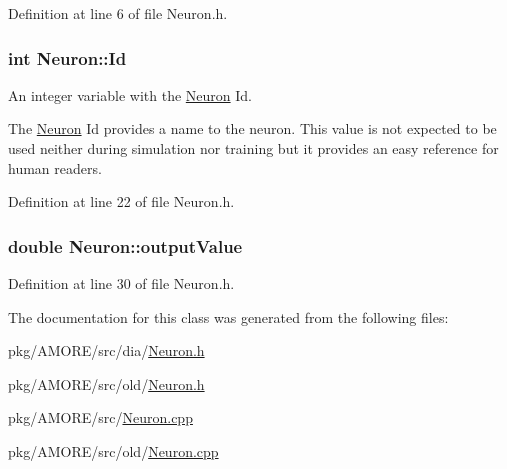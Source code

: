 Definition at line 6 of file Neuron.h.

\hypertarget{class_neuron_a72bb327a7c5c865e6748a4e074ce0680}{
\subsubsection[{Id}]{\setlength{\rightskip}{0pt plus 5cm}int {\bf Neuron::Id}}}
\label{class_neuron_a72bb327a7c5c865e6748a4e074ce0680}


An integer variable with the \hyperlink{class_neuron}{Neuron} Id. 

The \hyperlink{class_neuron}{Neuron} Id provides a name to the neuron. This value is not expected to be used neither during simulation nor training but it provides an easy reference for human readers. 

Definition at line 22 of file Neuron.h.

\hypertarget{class_neuron_ada029047646c36e525a6a1b77cafc03c}{
\subsubsection[{outputValue}]{\setlength{\rightskip}{0pt plus 5cm}double {\bf Neuron::outputValue}}}
\label{class_neuron_ada029047646c36e525a6a1b77cafc03c}


Definition at line 30 of file Neuron.h.



The documentation for this class was generated from the following files:\begin{DoxyCompactItemize}
\item 
pkg/AMORE/src/dia/\hyperlink{dia_2_neuron_8h}{Neuron.h}\item 
pkg/AMORE/src/old/\hyperlink{old_2_neuron_8h}{Neuron.h}\item 
pkg/AMORE/src/\hyperlink{_neuron_8cpp}{Neuron.cpp}\item 
pkg/AMORE/src/old/\hyperlink{old_2_neuron_8cpp}{Neuron.cpp}\end{DoxyCompactItemize}

